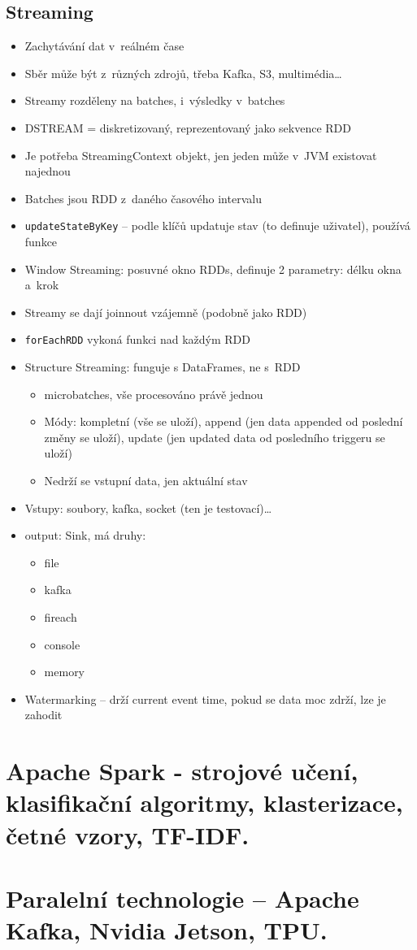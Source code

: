 \subsection{Streaming}
\begin{itemize}
    \item Zachytávání dat v~reálném čase
    \item Sběr může být z~různých zdrojů, třeba Kafka, S3, multimédia\dots
    \item Streamy rozděleny na batches, i~výsledky v~batches
    \item DSTREAM = diskretizovaný, reprezentovaný jako sekvence RDD
    \item Je potřeba StreamingContext objekt, jen jeden může v~JVM existovat najednou
    \item Batches jsou RDD z~daného časového intervalu
    \item \texttt{updateStateByKey} -- podle klíčů updatuje stav (to definuje uživatel), používá funkce
    \item Window Streaming: posuvné okno RDDs, definuje 2 parametry: délku okna a~krok
    \item Streamy se dají joinnout vzájemně (podobně jako RDD)
    \item \texttt{forEachRDD} vykoná funkci nad každým RDD
    \item Structure Streaming: funguje s DataFrames, ne s~RDD
    \begin{itemize}
        \item microbatches, vše procesováno právě jednou
        \item Módy: kompletní (vše se uloží), append (jen data appended od poslední změny se uloží), update (jen updated data od posledního triggeru se uloží)
        \item Nedrží se vstupní data, jen aktuální stav
    \end{itemize}
    \item Vstupy: soubory, kafka, socket (ten je testovací)\dots
    \item output: Sink, má druhy:
    \begin{itemize}
        \item file
        \item kafka
        \item fireach
        \item console
        \item memory
    \end{itemize}
    \item Watermarking -- drží current event time, pokud se data moc zdrží, lze je zahodit
\end{itemize}



\section{Apache Spark - strojové učení, klasifikační algoritmy, klasterizace, četné vzory, TF-IDF.}
\section{Paralelní technologie – Apache Kafka, Nvidia Jetson, TPU.}